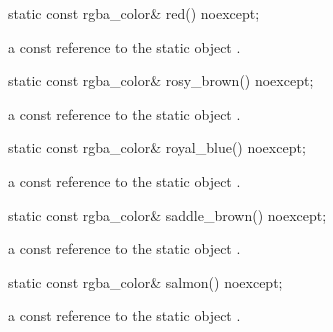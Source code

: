 \begin{itemdecl}
    static const rgba_color& red() noexcept;
\end{itemdecl}
\begin{itemdescr}
    \pnum
    \returns
    a const reference to the static  object .
\end{itemdescr}

\begin{itemdecl}
    static const rgba_color& rosy_brown() noexcept;
\end{itemdecl}
\begin{itemdescr}
    \pnum
    \returns
    a const reference to the static  object .
\end{itemdescr}

\begin{itemdecl}
    static const rgba_color& royal_blue() noexcept;
\end{itemdecl}
\begin{itemdescr}
    \pnum
    \returns
    a const reference to the static  object .
\end{itemdescr}

\begin{itemdecl}
    static const rgba_color& saddle_brown() noexcept;
\end{itemdecl}
\begin{itemdescr}
    \pnum
    \returns
    a const reference to the static  object .
\end{itemdescr}

\begin{itemdecl}
    static const rgba_color& salmon() noexcept;
\end{itemdecl}
\begin{itemdescr}
    \pnum
    \returns
    a const reference to the static  object .
\end{itemdescr}

